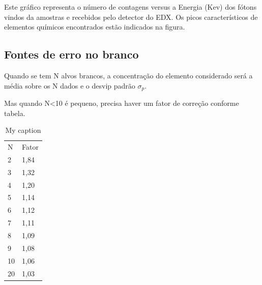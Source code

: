 

Este gráfico representa o número de contagens  versus a Energia (Kev) dos 	fótons vindos da amostras e recebidos pelo detector do EDX. Os picos 	característicos de elementos químicos encontrados estão indicados na figura.

\subsection{Fontes de erro no branco}

Quando se tem N alvos brancos, a concentração do elemento 
considerado será a média sobre os N dados e o desvip padrão $\sigma_p$.

Mas quando N<10 é pequeno, precisa haver um fator de correção conforme tabela.

\begin{table}[H]
\centering
\caption{My caption}
\label{my-label}
\begin{tabular}{ll}
N  & Fator \\
2  & 1,84  \\
3  & 1,32  \\
4  & 1,20  \\
5  & 1,14  \\
6  & 1,12  \\
7  & 1,11  \\
8  & 1,09  \\
9  & 1,08  \\
10 & 1,06  \\
20 & 1,03 
\end{tabular}
\end{table}






